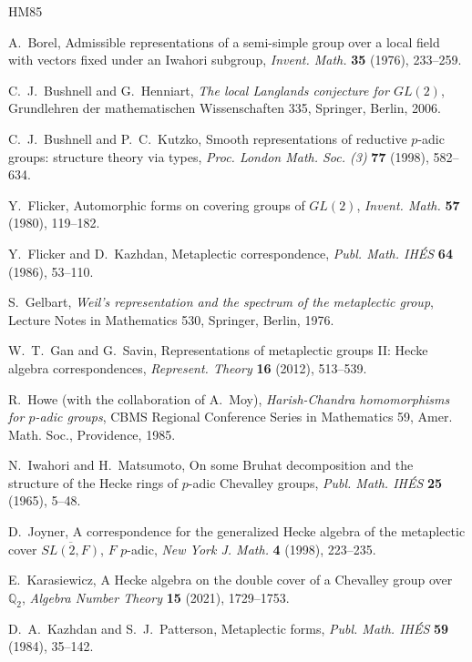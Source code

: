 \documentclass[12pt,letterpaper]{amsart}
\numberwithin{equation}{section}
\theoremstyle{definition}
\theoremstyle{remark}
\begin{document}
\begin{thebibliography}{HM85}

 A.~Borel, Admissible representations of a
semi-simple group over a local field with vectors fixed under an
Iwahori subgroup, \emph{Invent. Math.} \textbf{35} (1976), 233--259.

 C.~J.~Bushnell and G.~Henniart, \emph{The local
Langlands conjecture for $GL(2)$}, Grundlehren der mathematischen
Wissenschaften 335, Springer, Berlin, 2006.

 C.~J.~Bushnell and P.~C.~Kutzko, Smooth
representations of reductive $p$-adic groups: structure theory via
types, \emph{Proc. London Math. Soc. (3)} \textbf{77} (1998), 582--634.

 Y.~Flicker, Automorphic forms on covering groups
of $GL(2)$, \emph{Invent. Math.} \textbf{57} (1980), 119--182.

 Y.~Flicker and D.~Kazhdan, Metaplectic
correspondence, \emph{Publ. Math. IH\'ES} \textbf{64} (1986), 53--110.

 S.~Gelbart, \emph{Weil's representation and the
spectrum of the metaplectic group}, Lecture Notes in Mathematics 530,
Springer, Berlin, 1976.

 W.~T.~Gan and G.~Savin, Representations of
metaplectic groups II: Hecke algebra correspondences, \emph{Represent.
Theory} \textbf{16} (2012), 513--539.

 R.~Howe (with the collaboration of A.~Moy),
\emph{Harish-Chandra homomorphisms for $p$-adic groups}, CBMS Regional
Conference Series in Mathematics 59, Amer. Math. Soc., Providence,
1985.

 N.~Iwahori and H.~Matsumoto, On some Bruhat
decomposition and the structure of the Hecke rings of $p$-adic
Chevalley groups, \emph{Publ. Math. IH\'ES} \textbf{25} (1965),
5--48.

 D.~Joyner, A correspondence for the generalized
Hecke algebra of the metaplectic cover $\overline{SL(2,F)}$, $F$
$p$-adic, \emph{New York J. Math.} \textbf{4} (1998), 223--235.

 E.~Karasiewicz, A Hecke algebra on the double
cover of a Chevalley group over $\mathbb{Q}_2$, \emph{Algebra Number
Theory} \textbf{15} (2021), 1729--1753.

 D.~A.~Kazhdan and S.~J.~Patterson, Metaplectic
forms, \emph{Publ. Math. IH\'ES} \textbf{59} (1984), 35--142.


\end{thebibliography}
\end{document}
